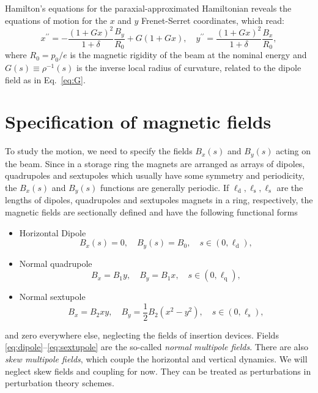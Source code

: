 Hamilton's equations for the paraxial-approximated Hamiltonian reveals the equations of motion for the $x$ and $y$ Frenet-Serret coordinates, which read:
\begin{equation}
x^{\prime \prime}=-\frac{(1+G x)^{2}}{1+\delta} \frac{B_{y}}{R_0}+G(1+G x),
\quad
y^{\prime \prime}=\frac{(1+G x)^{2}}{1+\delta} \frac{B_{x}}{R_0},
\label{eq:EOMs}
\end{equation}
where $R_0 = p_0/e$ is the magnetic rigidity of the beam at the nominal energy and $G(s)\equiv\rho^{-1}(s)$ is the inverse local radius of curvature, related to the dipole field as in Eq.~\eqref{eq:G}.
\section{Specification of magnetic fields}
To study the motion, we need to specify the fields $B_x(s)$ and $B_y(s)$ acting on the beam. Since in a storage ring the magnets are arranged as arrays of dipoles, quadrupoles and sextupoles which usually have some symmetry and periodicity, the $B_x(s)$ and $B_y(s)$ functions are generally periodic. If $\ell_{\text{d}}, \ell_{\text{s}}, \ell_{\text{s}}$ are the lengths of dipoles, quadrupoles and sextupoles magnets in a ring, respectively, the magnetic fields are sectionally defined and have the following functional forms
\begin{itemize}
    \item Horizontal Dipole
           \begin{equation} B_x(s) = 0, \quad B_y(s) = B_0, \quad s\in(0,\ell_{\text{d}}),
            \label{eq:dipole}
           \end{equation}
    \item Normal quadrupole
          \begin{equation}B_x = B_1 y, \quad B_y = B_1 x, \quad s\in(0,\ell_{\text{q}}),
            \label{eq:quadrupole}
           \end{equation}
    \item Normal sextupole
          \begin{equation}B_x = B_2xy, \quad B_y = \frac{1}{2}B_2(x^2 - y^2), \quad s\in(0,\ell_{\text{s}}),
            \label{eq:sextupole}
           \end{equation}
\end{itemize}
and zero everywhere else, neglecting the fields of insertion devices. Fields \eqref{eq:dipole}--\eqref{eq:sextupole}  are the so-called \textit{normal multipole fields}. There are also \textit{skew multipole fields}, which couple the horizontal and vertical dynamics. We will neglect skew fields and coupling for now. They can be treated as perturbations in perturbation theory schemes.

